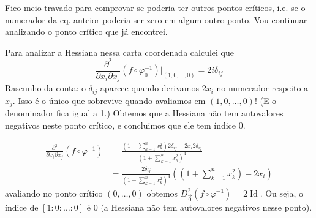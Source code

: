 \begin{remark}\leavevmode
Fico meio travado para comprovar se poderia ter outros pontos críticos, i.e. se o numerador da eq. anteior poderia ser zero em algum outro ponto. Vou continuar analizando o ponto crítico que já encontrei.
\end{remark}

	Para analizar a Hessiana nessa carta coordenada calculei que
	\[\frac{\partial^2}{\partial x_i\partial x_j}(f \circ \varphi_0^{-1})\Big|_{(1,0,\ldots,0)}=2i\delta_{ij}\]
Rascunho da conta: o \(\delta_{ij}\) aparece quando derivamos \(2x_i\) no numerador respeito a \(x_j\). Isso é o único que sobrevive quando avaliamos em \((1,0,\ldots,0)\)! (E o denominador fica igual a 1.) Obtemos que a Hessiana não tem autovalores negativos neste ponto crítico, e concluimos que ele tem índice 0.

	\begin{align*}
	\frac{\partial^2}{\partial x_i\partial x_j}(f \circ \varphi^{-1})&=\frac{\left(1+\sum_{k=1}^nx_k^2\right) 2 \delta_{ij}-2x_i 2\delta_{ij}}{\left(1+\sum_{k=1}^nx_k^2\right)^4}\\
	&=\frac{2\delta_{ij}}{\left(1+\sum_{k=1}^n x_k^2\right)^4}\left(\left(1+\sum_{k=1}^nx_k^2\right) -2x_i\right) 
	\end{align*}
	avaliando no ponto crítico \((0,\ldots,0)\) obtemos \(D^2_{\vec{0}}(f\circ \varphi^{-1})=2\operatorname{Id}\). Ou seja, o índice de \([1:0:\ldots:0]\) é \(0\) (a Hessiana não tem autovalores negativos nesse ponto).\fi


